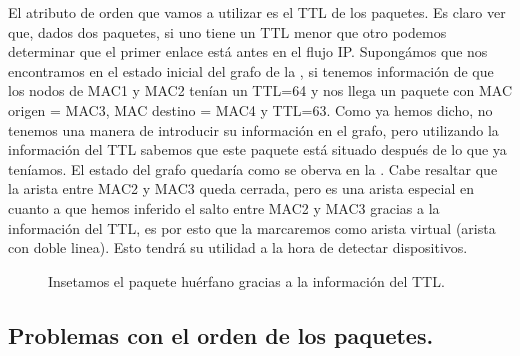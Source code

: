 \documentclass[twoside, 12pt]{epstfg}
\begin{document}
El atributo de orden que vamos a utilizar es el TTL de los paquetes. Es claro ver que, dados dos paquetes, si uno tiene un TTL menor que otro podemos determinar que el primer enlace está antes en el flujo IP. Supongámos que nos encontramos en el estado inicial del grafo de la , si tenemos información de que los nodos de MAC1 y MAC2 tenían un TTL=64 y nos llega un paquete con MAC origen = MAC3, MAC destino = MAC4 y TTL=63. Como ya hemos dicho, no tenemos una manera de introducir su información en el grafo, pero utilizando la información del TTL sabemos que este paquete está situado después de lo que ya teníamos. El estado del grafo quedaría como se oberva en la . Cabe resaltar que la  arista entre MAC2 y MAC3 queda cerrada, pero es una arista especial en cuanto a que hemos inferido el salto entre MAC2 y MAC3 gracias a la información del TTL, es por esto que la marcaremos como arista virtual (arista con doble linea). Esto tendrá su utilidad a la hora de detectar dispositivos.

\begin{figure}
\centering

\caption[Ejemplo de resolución de camino huérfano]{Insetamos el paquete huérfano gracias a la información del TTL.}
\label{fig:Analisis:OrphanPath}
\end{figure}

\subsection{Problemas con el orden de los paquetes.}
\end{document}
